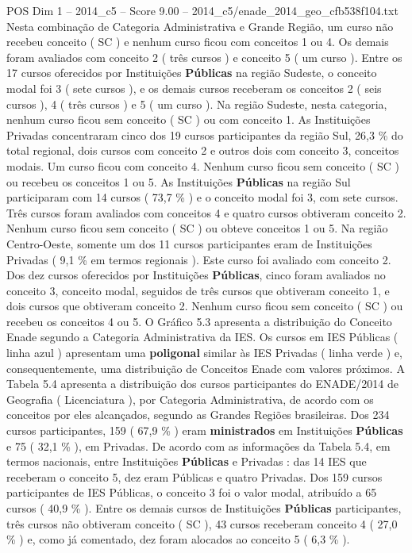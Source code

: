 \begin{textsample}{POS Dim 1 – 2014\_c5 – Score 9.00 – 2014\_c5/enade\_2014\_geo\_cfb538f104.txt}
Nesta combinação de Categoria Administrativa e Grande Região, um curso não recebeu conceito ( SC ) e nenhum curso ficou com conceitos 1 ou 4.
Os demais foram avaliados com conceito 2 ( três cursos ) e conceito 5 ( um curso ).
Entre os 17 cursos oferecidos por Instituições \textbf{Públicas} na região Sudeste, o conceito modal foi 3 ( sete cursos ), e os demais cursos receberam os conceitos 2 ( seis cursos ), 4 ( três cursos ) e 5 ( um curso ).
Na região Sudeste, nesta categoria, nenhum curso ficou sem conceito ( SC ) ou com conceito 1.
As Instituições Privadas concentraram cinco dos 19 cursos participantes da região Sul, 26,3 \% do total regional, dois cursos com conceito 2 e outros dois com conceito 3, conceitos modais.
Um curso ficou com conceito 4.
Nenhum curso ficou sem conceito ( SC ) ou recebeu os conceitos 1 ou 5.
As Instituições \textbf{Públicas} na região Sul participaram com 14 cursos ( 73,7 \% ) e o conceito modal foi 3, com sete cursos.
Três cursos foram avaliados com conceitos 4 e quatro cursos obtiveram conceito 2.
Nenhum curso ficou sem conceito ( SC ) ou obteve conceitos 1 ou 5.
Na região Centro-Oeste, somente um dos 11 cursos participantes eram de Instituições Privadas ( 9,1 \% em termos regionais ).
Este curso foi avaliado com conceito 2.
Dos dez cursos oferecidos por Instituições \textbf{Públicas}, cinco foram avaliados no conceito 3, conceito modal, seguidos de três cursos que obtiveram conceito 1, e dois cursos que obtiveram conceito 2.
Nenhum curso ficou sem conceito ( SC ) ou recebeu os conceitos 4 ou 5.
O Gráfico 5.3 apresenta a distribuição do Conceito Enade segundo a Categoria Administrativa da IES.
Os cursos em IES Públicas ( linha azul ) apresentam uma \textbf{poligonal} similar às IES Privadas ( linha verde ) e, consequentemente, uma distribuição de Conceitos Enade com valores próximos.
A Tabela 5.4 apresenta a distribuição dos cursos participantes do ENADE/2014 de Geografia ( Licenciatura ), por Categoria Administrativa, de acordo com os conceitos por eles alcançados, segundo as Grandes Regiões brasileiras.
Dos 234 cursos participantes, 159 ( 67,9 \% ) eram \textbf{ministrados} em Instituições \textbf{Públicas} e 75 ( 32,1 \% ), em Privadas.
De acordo com as informações da Tabela 5.4, em termos nacionais, entre Instituições \textbf{Públicas} e Privadas : das 14 IES que receberam o conceito 5, dez eram Públicas e quatro Privadas.
Dos 159 cursos participantes de IES Públicas, o conceito 3 foi o valor modal, atribuído a 65 cursos ( 40,9 \% ).
Entre os demais cursos de Instituições \textbf{Públicas} participantes, três cursos não obtiveram conceito ( SC ), 43 cursos receberam conceito 4 ( 27,0 \% ) e, como já comentado, dez foram alocados ao conceito 5 ( 6,3 \% ).

\end{textsample}

